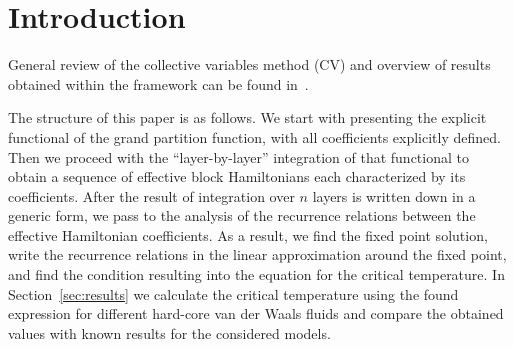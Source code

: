 \section{Introduction}

General review of the collective variables method (CV) and overview of results obtained within the framework can be found in~\cite{Yukh2015En}.


The structure of this paper is as follows. We start with presenting the explicit functional of the grand partition function, with all coefficients explicitly defined. Then we proceed with the ``layer-by-layer'' integration of that functional to obtain a sequence of effective block Hamiltonians each characterized by its coefficients. After the result of integration over $n$ layers is written down in a generic form, we pass to the analysis of the recurrence relations between the effective Hamiltonian coefficients. As a result, we find the fixed point solution, write the recurrence relations in the linear approximation around the fixed point, and find the condition resulting into the equation for the critical temperature. In Section~\ref{sec:results} we calculate the critical temperature using the found expression for different hard-core van der Waals fluids and compare the obtained values with known results for the considered models.

